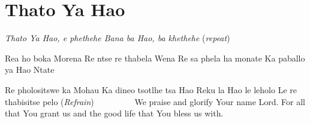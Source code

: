 \starttocol
\chapter{Thato Ya Hao}
\nexttocol
\hfill{\it }
\stoptocol
\starttocol
\startlines
{\it
T{\sc hato} Ya Hao, e phethehe
Bana ba Hao, ba khethehe}  \hfill({\it repeat})~~~~~~~~~

Rea ho boka Morena
Re ntse re thabela Wena
Re sa phela ha monate
Ka paballo ya Hao Ntate

Re pholositswe ka Mohau
Ka dineo tsotlhe tsa Hao
Reku la Hao le leholo
Le re thabisitse pelo
 \hfill({\it Refrain})~~~~~~~~~
\stoplines
\nexttocol
We praise and glorify Your name Lord.
For all that You grant us and the good life that You bless us with.
\stoptocol
